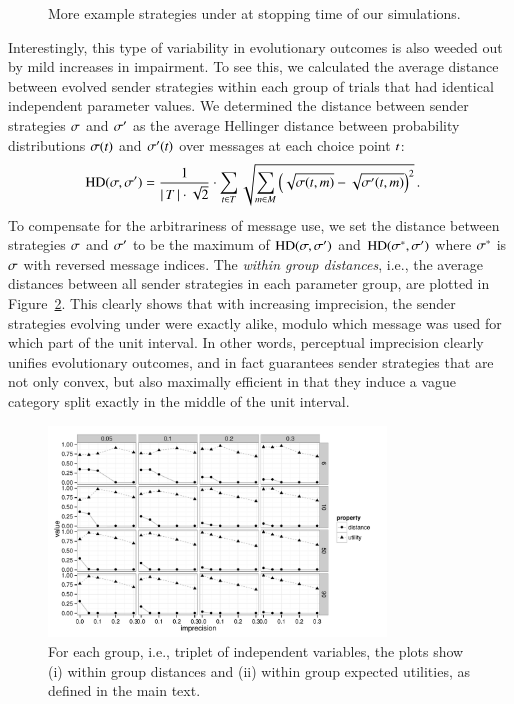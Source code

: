 \begin{figure}
  \caption{More example strategies under \rdd at stopping time of our simulations.}
  \label{fig:MoreExample_strats}
\end{figure}

Interestingly, this type of variability in evolutionary outcomes is
also weeded out by mild increases in impairment. To see this, we
calculated the average distance between evolved sender strategies
within each group of trials that had identical independent
parameter values. We determined the distance between sender strategies
$\sigma$ and $\sigma'$ as the average Hellinger distance between
probability distributions $\sigma(t)$ and $\sigma'(t)$
over messages at each choice point $t$:
\begin{align*}
  \text{HD}(\sigma,\sigma') & = \frac{1}{{\left \lvert \, T \, \right\rvert \cdot
     \sqrt{2}}} \cdot  \sum_{t \in T} 
 \sqrt{\sum_{m \in  M}
         \left ( \sqrt{\sigma(t,m)} -
         \sqrt{\sigma'(t,m)} \right )^2 }\,.
\end{align*}
To compensate for the arbitrariness of message use, we set the
distance between strategies $\sigma$ and $\sigma'$ to be the maximum
of $\text{HD}(\sigma,\sigma')$ and $\text{HD}(\sigma^*,\sigma')$
where $\sigma^*$ is $\sigma$ with reversed message indices. The
\emph{within group distances}, i.e., the average distances between all
sender strategies in each parameter group, are plotted in
Figure~\ref{fig:AverageEUinGroups}. This clearly shows that with
increasing imprecision, the sender strategies evolving under \rdd were
exactly alike, modulo which message was used for which part of the
unit interval. In other words, perceptual imprecision clearly unifies
evolutionary outcomes, and in fact guarantees sender strategies that
are not only convex, but also maximally efficient in that they induce
a vague category split exactly in the middle of the unit interval.

\begin{figure}
  \centering

    \includegraphics[width=0.8\textwidth]{plots/WithinGroupMeasures.pdf}

    \caption{For each group, i.e., triplet of independent variables,
      the plots show (i) within group distances and (ii) within group
      expected utilities, as defined in the main text.}
  \label{fig:AverageEUinGroups}
\end{figure}

